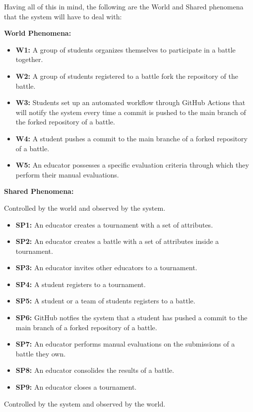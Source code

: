 \documentclass{article}
\begin{document}
Having all of this in mind, the following are the World and Shared phenomena that the system will have to deal with:

\textbf{World Phenomena:}
\begin{itemize}
    \item \textbf{W1:} A group of students organizes themselves to participate in a battle together.
    \item \textbf{W2:} A group of students registered to a battle fork the repository of the battle.
    \item \textbf{W3:} Students set up an automated workflow through GitHub Actions that will notify the system every time a commit is pushed to the main branch of the forked repository of a battle.
    \item \textbf{W4:} A student pushes a commit to the main branche of a forked repository of a battle.
    \item \textbf{W5:} An educator possesses a specific evaluation criteria through which they perform their manual evaluations.
\end{itemize}
\textbf{Shared Phenomena:}

Controlled by the world and observed by the system.

\begin{itemize}
    \item \textbf{SP1:} An educator creates a tournament with a set of attributes.
    \item \textbf{SP2:} An educator creates a battle with a set of attributes inside a tournament.
    \item \textbf{SP3:} An educator invites other educators to a tournament.
    \item \textbf{SP4:} A student registers to a tournament.
    \item \textbf{SP5:} A student or a team of students registers to a battle.
    \item \textbf{SP6:} GitHub notfies the system that a student has pushed a commit to the main branch of a forked repository of a battle. 
    \item \textbf{SP7:} An educator performs manual evaluations on the submissions of a battle they own.
    \item \textbf{SP8:} An educator consolides the results of a battle.
    \item \textbf{SP9:} An educator closes a tournament.
\end{itemize}

Controlled by the system and observed by the world.
\end{document}
